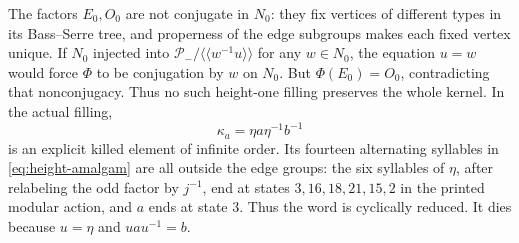 \documentclass[11pt]{amsart}
\theoremstyle{definition}
\theoremstyle{remark}
\newcommand{\nc}[1]{\langle\!\langle #1\rangle\!\rangle}
\begin{document}
The factors $E_0,O_0$ are not conjugate in $N_0$: they fix vertices
of different types in its Bass--Serre tree, and properness of the edge
subgroups makes each fixed vertex unique. If $N_0$ injected into
$\mathcal P_-/\nc{w^{-1}u}$ for any $w\in N_0$, the equation
$u=w$ would force $\Phi$ to be conjugation by $w$ on $N_0$.
But $\Phi(E_0)=O_0$, contradicting that nonconjugacy. Thus no such
height-one filling preserves the whole kernel. In the actual filling,
\[
                      \kappa_a=\eta a\eta^{-1}b^{-1}
\]
is an explicit killed element of infinite order. Its fourteen
alternating syllables in \eqref{eq:height-amalgam} are all outside the
edge groups: the six syllables of $\eta$, after relabeling the odd
factor by $j^{-1}$, end at states $3,16,18,21,15,2$ in the printed
modular action, and $a$ ends at state $3$. Thus the word is cyclically
reduced. It dies because $u=\eta$ and $uau^{-1}=b$.
\end{document}
